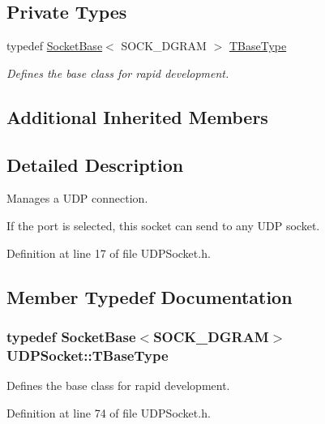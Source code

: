 \subsection*{Private Types}
\begin{DoxyCompactItemize}
\item 
typedef \hyperlink{class_socket_base}{Socket\-Base}$<$ S\-O\-C\-K\-\_\-\-D\-G\-R\-A\-M $>$ \hyperlink{class_u_d_p_socket_abdd3401d1e8ac4129eb799d02e6db28b}{T\-Base\-Type}
\begin{DoxyCompactList}\small\item\em Defines the base class for rapid development. \end{DoxyCompactList}\end{DoxyCompactItemize}
\subsection*{Additional Inherited Members}


\subsection{Detailed Description}
Manages a U\-D\-P connection. 

If the port is selected, this socket can send to any U\-D\-P socket. 

Definition at line 17 of file U\-D\-P\-Socket.\-h.



\subsection{Member Typedef Documentation}
\hypertarget{class_u_d_p_socket_abdd3401d1e8ac4129eb799d02e6db28b}{
\subsubsection[{T\-Base\-Type}]{\setlength{\rightskip}{0pt plus 5cm}typedef {\bf Socket\-Base}$<$S\-O\-C\-K\-\_\-\-D\-G\-R\-A\-M$>$ {\bf U\-D\-P\-Socket\-::\-T\-Base\-Type}\hspace{0.3cm}{\ttfamily [private]}}}\label{class_u_d_p_socket_abdd3401d1e8ac4129eb799d02e6db28b}


Defines the base class for rapid development. 



Definition at line 74 of file U\-D\-P\-Socket.\-h.



